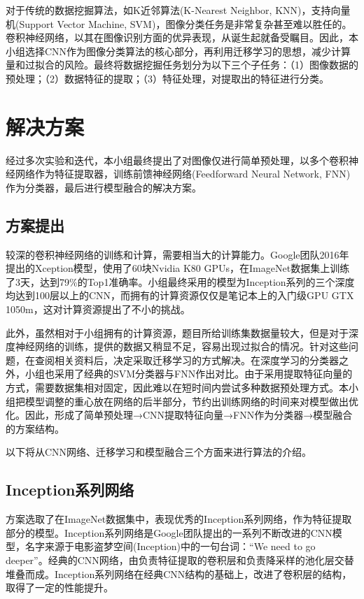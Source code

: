 \documentclass[10.5pt,twocolumn]{jbuaa}
\begin{document}
对于传统的数据挖掘算法，如K近邻算法(K-Nearest Neighbor, KNN)，支持向量机(Support Vector Machine, SVM)，图像分类任务是非常复杂甚至难以胜任的。卷积神经网络，以其在图像识别方面的优异表现，从诞生起就备受瞩目。因此，本小组选择CNN作为图像分类算法的核心部分，再利用迁移学习的思想，减少计算量和过拟合的风险。最终将数据挖掘任务划分为以下三个子任务：（1）图像数据的预处理；（2）数据特征的提取；（3）特征处理，对提取出的特征进行分类。

\section{解决方案}
经过多次实验和迭代，本小组最终提出了对图像仅进行简单预处理，以多个卷积神经网络作为特征提取器，训练前馈神经网络(Feedforward Neural Network, FNN)作为分类器，最后进行模型融合的解决方案。
\subsection{方案提出}
较深的卷积神经网络的训练和计算，需要相当大的计算能力。Google团队2016年提出的Xception模型，使用了60块Nvidia K80 GPUs，在ImageNet数据集上训练了3天，达到79\%的Top1准确率。小组最终采用的模型为Inception系列的三个深度均达到100层以上的CNN，而拥有的计算资源仅仅是笔记本上的入门级GPU GTX 1050m，这对计算资源提出了不小的挑战。

此外，虽然相对于小组拥有的计算资源，题目所给训练集数据量较大，但是对于深度神经网络的训练，提供的数据又稍显不足，容易出现过拟合的情况。针对这些问题，在查阅相关资料后，决定采取迁移学习的方式解决。在深度学习的分类器之外，小组也采用了经典的SVM分类器与FNN作出对比。由于采用提取特征向量的方式，需要数据集相对固定，因此难以在短时间内尝试多种数据预处理方式。本小组把模型调整的重心放在网络的后半部分，节约出训练网络的时间来对模型做出优化。因此，形成了简单预处理→CNN提取特征向量→FNN作为分类器→模型融合的方案结构。

以下将从CNN网络、迁移学习和模型融合三个方面来进行算法的介绍。

\subsection{Inception系列网络}
方案选取了在ImageNet数据集中，表现优秀的Inception系列网络，作为特征提取部分的模型。Inception系列网络是Google团队提出的一系列不断改进的CNN模型，名字来源于电影盗梦空间(Inception)中的一句台词：``We need to go deeper''。经典的CNN网络，由负责特征提取的卷积层和负责降采样的池化层交替堆叠而成。Inception系列网络在经典CNN结构的基础上，改进了卷积层的结构，取得了一定的性能提升。
\end{document}

